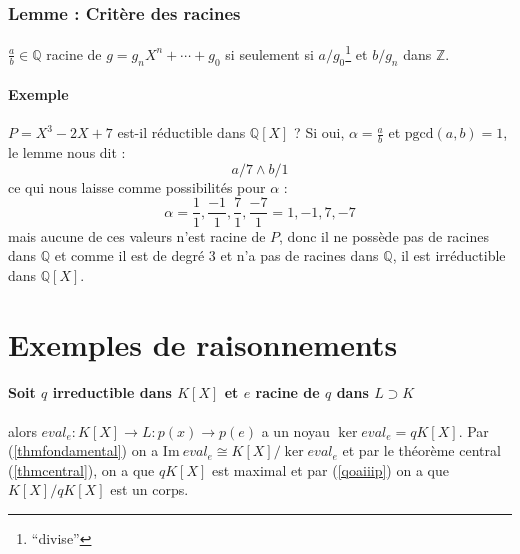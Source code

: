 \documentclass[a4paper,10pt]{article}
\newcommand{\ap}{ \rightarrow} %
\newcommand{\im}{\mathrm{Im}\:} %
\newcommand{\ZZ}{\mathbb{Z}} %
\newcommand{\QQ}{\mathbb{Q}} %
\newcommand{\pgcd}{\mathrm{pgcd}} %
\newcommand{\mfootnote}[1]{\up{(}\footnote{#1}\up{)}}
\begin{document}
  \subsubsection{Lemme : Critère des racines}
   $\frac{a}{b} \in \QQ$ racine de $g=g_n X^n + \cdots + g_0$ si seulement si
   $a/g_0$\mfootnote{``divise''} et $b/g_n$ dans $\ZZ$.
   \paragraph{Exemple} $P=X^3-2X+7$ est-il réductible dans $\QQ[X]$ ? Si oui,
    $\alpha=\frac{a}{b}$ et $\pgcd (a,b)=1$, le lemme nous dit : 
    $$a/ 7 \land b/1$$
    ce qui nous laisse comme possibilités pour $\alpha$ :
    $$\alpha=\frac{1}{1},\frac{-1}{1},\frac{7}{1},\frac{-7}{1}=1,-1,7,-7$$
    mais aucune de ces valeurs n'est racine de $P$, donc il ne possède pas de
    racines dans $\QQ$ et comme il est de degré 3 et n'a pas de racines dans
    $\QQ$, il est irréductible dans $\QQ[X]$.
\section{Exemples de  raisonnements}
  \paragraph{Soit $q$  irreductible dans $K[X]$ et $e$ racine de $q$
  dans $L \supset K$} alors $eval_{e} : K[X] \ap L : p(x)\ap p(e)$
  a un noyau $\ker eval_{e} = qK[X]$. Par (\ref{thmfondamental}) on a 
  $\im eval_{e} \cong K[X]/\ker eval_{e}$ et par le théorème central
  (\ref{thmcentral}), on a que $qK[X]$ est maximal et par (\ref{qoaiiip}) on a
  que $K[X]/qK[X]$ est un corps.
\end{document}
